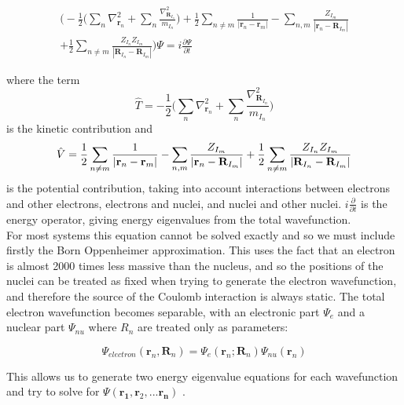 \documentclass[10pt]{article}
\begin{document}
\begin{gather*}
	\biggr(-\frac{1}{2}\biggr(\sum_n\nabla^2_{\textbf{r}_n}+\sum_{n}\frac{\nabla^2_{\textbf{R}_{I_n}}}{m_{I_n}}\biggr)+\frac{1}{2}\sum_{n\not=m}\frac{1}{|\textbf{r}_n-\textbf{r}_m|}-\sum_{n,m}\frac{Z_{I_m}}{|\textbf{r}_n - \textbf{R}_{I_m}|}\\
	+\frac{1}{2}\sum_{n\not=m}\frac{Z_{I_n}Z_{I_m}}{|\textbf{R}_{I_n}-\textbf{R}_{I_m}|}\biggr)\Psi = i\frac{\partial\Psi}{\partial t}
\end{gather*}

where the term $$\hat{T} = -\frac{1}{2}\biggr(\sum_n\nabla^2_{\textbf{r}_n}+\sum_{n}\frac{\nabla^2_{\textbf{R}_{I_n}}}{m_{I_n}}\biggr)$$ is the kinetic contribution and $$\hat{V}=\frac{1}{2}\sum_{n\not=m}\frac{1}{|\textbf{r}_n-\textbf{r}_m|}-\sum_{n,m}\frac{Z_{I_m}}{|\textbf{r}_n - \textbf{R}_{I_m}|}\\
+\frac{1}{2}\sum_{n\not=m}\frac{Z_{I_n}Z_{I_m}}{|\textbf{R}_{I_n}-\textbf{R}_{I_m}|}$$ is the potential contribution, taking into account interactions between electrons and other electrons, electrons and nuclei, and nuclei and other nuclei.  $i\frac{\partial}{\partial t}$ is the energy operator, giving energy eigenvalues from the total wavefunction.\\

For most systems this equation cannot be solved exactly and so we must include firstly the Born Oppenheimer approximation. This uses the fact that an electron is almost 2000 times less massive than the nucleus, and so the positions of the nuclei can be treated as fixed when trying to generate the electron wavefunction, and therefore the source of the Coulomb interaction is always static. The total electron wavefunction becomes separable, with an electronic part $\Psi_e$ and a nuclear part $\Psi_{nu}$ where $R_n$ are treated only as parameters:

\begin{equation*}
	\Psi_{electron}(\textbf{r}_n,\textbf{R}_n) =  \Psi_e(\textbf{r}_n;\textbf{R}_n)\Psi_{nu}(\textbf{r}_{n})
\end{equation*}

This allows us to generate two energy eigenvalue equations for each wavefunction and try to solve for $\Psi(\mathbf{r_1},\mathbf{r}_2,...\mathbf{r_n})$ \cite{rebolini2014range}. 
\end{document}
